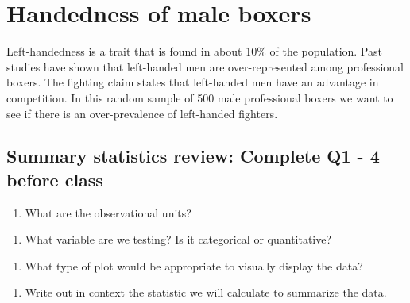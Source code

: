 \documentclass[
]{report}
\providecommand{\tightlist}{%
  \setlength{\itemsep}{0pt}\setlength{\parskip}{0pt}}
\begin{document}
\hypertarget{handedness-of-male-boxers}{%
\section{Handedness of male boxers}\label{handedness-of-male-boxers}}

Left-handedness is a trait that is found in about 10\% of the population. Past studies have shown that left-handed men are over-represented among professional boxers. The fighting claim states that left-handed men have an advantage in competition. In this random sample of 500 male professional boxers we want to see if there is an over-prevalence of left-handed fighters.

\hypertarget{summary-statistics-review-complete-q1---4-before-class}{%
\subsection*{Summary statistics review: Complete Q1 - 4 before class}\label{summary-statistics-review-complete-q1---4-before-class}}

\begin{enumerate}
\def\labelenumi{\arabic{enumi}.}
\tightlist
\item
  What are the observational units?
\end{enumerate}

\vspace{0.5in}

\begin{enumerate}
\def\labelenumi{\arabic{enumi}.}
\setcounter{enumi}{1}
\tightlist
\item
  What variable are we testing? Is it categorical or quantitative?
\end{enumerate}

\vspace{0.5in}

\begin{enumerate}
\def\labelenumi{\arabic{enumi}.}
\setcounter{enumi}{2}
\tightlist
\item
  What type of plot would be appropriate to visually display the data?
\end{enumerate}

\vspace{0.5in}

\begin{enumerate}
\def\labelenumi{\arabic{enumi}.}
\setcounter{enumi}{3}
\tightlist
\item
  Write out in context the statistic we will calculate to summarize the data.
\end{enumerate}
\end{document}
